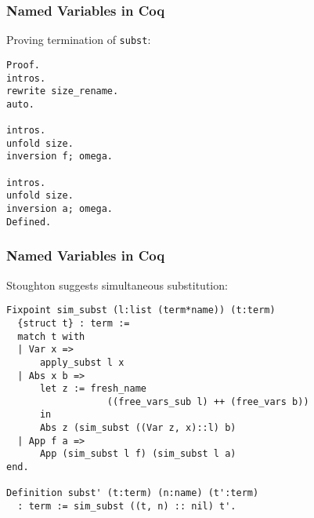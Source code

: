 \documentclass[notheorems]{beamer}
\begin{document}
\begin{frame}[fragile]

  \frametitle{Named Variables in Coq}

  Proving termination of \texttt{subst}:
  \begin{lstlisting}
Proof.
intros.
rewrite size_rename.
auto.

intros.
unfold size.
inversion f; omega.

intros.
unfold size.
inversion a; omega.
Defined.
  \end{lstlisting}

\end{frame}


\begin{frame}[fragile]

  \frametitle{Named Variables in Coq}

  Stoughton suggests simultaneous substitution:
  \begin{lstlisting}
Fixpoint sim_subst (l:list (term*name)) (t:term)
  {struct t} : term :=
  match t with
  | Var x =>
      apply_subst l x
  | Abs x b =>
      let z := fresh_name
                  ((free_vars_sub l) ++ (free_vars b))
      in
      Abs z (sim_subst ((Var z, x)::l) b)
  | App f a =>
      App (sim_subst l f) (sim_subst l a)
end.

Definition subst' (t:term) (n:name) (t':term)
  : term := sim_subst ((t, n) :: nil) t'.
  \end{lstlisting}

\end{frame}


\end{document}
